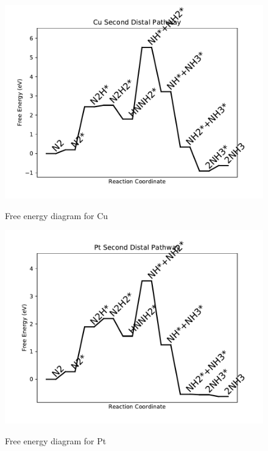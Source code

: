 \documentclass{article}
\begin{document}
\newpage
\begin{figure}
\includegraphics[width=1\linewidth]{data/plots/Cu_distal_2.pdf}
\label{fig:Cu_distal_2}
\caption{Free energy diagram for Cu}
\end{figure}

\begin{figure}
\includegraphics[width=1\linewidth]{data/plots/Pt_distal_2.pdf}
\label{fig:Pt_distal_2}
\caption{Free energy diagram for Pt}
\end{figure}
\end{document}
